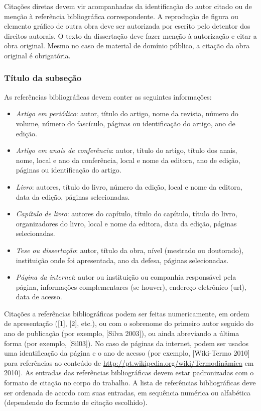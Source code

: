 \documentclass[a4paper,12pt,oneside]{book}
\begin{document}
Citações diretas devem vir acompanhadas da identificação do autor citado ou de
menção à referência bibliográfica correspondente. A reprodução de figura ou elemento
gráfico de outra obra deve ser autorizada por escrito pelo detentor dos direitos autorais.
O texto da dissertação deve fazer menção à autorização e citar a obra original. Mesmo
no caso de material de domínio público, a citação da obra original é obrigatória.

\subsubsection{Título da subseção}

As referências bibliográficas devem conter as seguintes informações:

\begin{itemize}

\item[i.] \textit{Artigo em periódico}: autor, título do artigo, nome da revista, número do volume,
número do fascículo, páginas ou identificação do artigo, ano de edição.

\item[ii.] \textit{Artigo em anais de conferência}: autor, título do artigo, título dos anais, nome,
local e ano da conferência, local e nome da editora, ano de edição, páginas ou
identificação do artigo.

\item[iii.] \textit{Livro}: autores, título do livro, número da edição, local e nome da editora, data da
edição, páginas selecionadas.

\item[iv.] \textit{Capítulo de livro}: autores do capítulo, título do capítulo, título do livro,
organizadores do livro, local e nome da editora, data da edição, páginas
selecionadas.

\item[v.] \textit{Tese ou dissertação}: autor, título da obra, nível (mestrado ou doutorado),
instituição onde foi apresentada, ano da defesa, páginas selecionadas.

\item[vi.] \textit{Página da internet}: autor ou instituição ou companhia responsável pela página,
informações complementares (se houver), endereço eletrônico (url), data de
acesso.

\end{itemize}

Citações a referências bibliográficas podem ser feitas numericamente, em ordem de apresentação ([1], [2], etc.), ou com o sobrenome do primeiro autor seguido do ano de publicação (por exemplo, [Silva 2003]), ou ainda abreviando a última forma (por exemplo, [Sil03]). No caso de páginas da internet, podem ser usados uma identificação da página e o ano de acesso (por exemplo, [Wiki-Termo 2010] para referências ao conteúdo de \url{http://pt.wikipedia.org/wiki/Termodinâmica} em 2010). As entradas das referências bibliográficas devem estar padronizadas com o formato de citação no corpo do trabalho. A lista de referências bibliográficas deve ser ordenada de acordo com suas entradas, em sequência numérica ou alfabética (dependendo do formato de citação escolhido).
\end{document}
